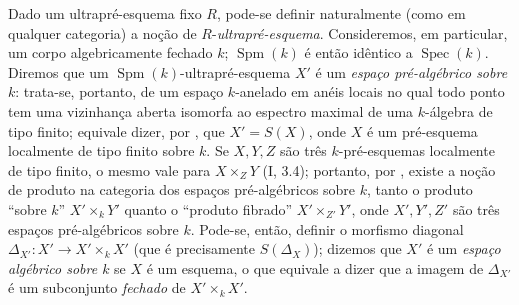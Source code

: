\begin{env}[10.10.2]
\label{IV.10.10.2}
Dado um ultrapré-esquema fixo $R$, pode-se definir naturalmente (como em qualquer categoria) a noção de $R$-\emph{ultrapré-esquema}.
Consideremos, em particular, um corpo algebricamente fechado $k$; $\operatorname{Spm}(k)$ é então idêntico a $\operatorname{Spec}(k)$.
Diremos que um $\operatorname{Spm}(k)$-ultrapré-esquema $X'$ é um \emph{espaço pré-algébrico sobre $k$}: trata-se, portanto, de um espaço $k$-anelado em anéis locais no qual todo ponto tem uma vizinhança aberta isomorfa ao espectro maximal de uma $k$-álgebra de tipo finito; equivale dizer, por , que $X'=S(X)$, onde $X$ é um pré-esquema localmente de tipo finito sobre $k$.
Se $X,Y,Z$ são três $k$-pré-esquemas localmente de tipo finito, o mesmo vale para $X\times_ZY$ \textup{(I, 3.4)}; portanto, por , existe a noção de produto na categoria dos espaços pré-algébricos sobre $k$, tanto o produto ``sobre $k$'' $X'\times_kY'$ quanto o ``produto fibrado'' $X'\times_{Z'}Y'$, onde $X',Y',Z'$ são três espaços pré-algébricos sobre $k$.
Pode-se, então, definir o morfismo diagonal $\Delta_{X'}:X'\to X'\times_kX'$ (que é precisamente $S(\Delta_X)$); dizemos que $X'$ é um \emph{espaço algébrico sobre $k$} se $X$ é um esquema, o que equivale a dizer que a imagem de $\Delta_{X'}$ é um subconjunto \emph{fechado} de $X'\times_kX'$.
\end{env}

